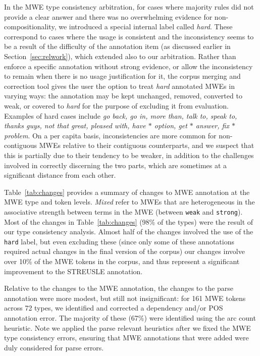 \documentclass[output=paper
,modfonts
,nonflat]{langsci/langscibook}
\newcommand{\lex}[1]{\textit{#1}\xspace}
\newcommand{\mwetype}[1]{\texttt{#1}\xspace}
\newcommand{\strongish}{\mwetype{strong}}
\newcommand{\weak}{\mwetype{weak}}
\newcommand{\hard}{\mwetype{hard}}
\newcommand{\gap}{$*$\xspace}
\newcommand{\tableref}[1]{Table~\ref{#1}\xspace}
\newcommand{\sectionref}[1]{Section~\ref{#1}\xspace}
\begin{document}
In the MWE type consistency arbitration, for cases where majority rules did not provide a clear answer and there was no overwhelming evidence for non-compositionality, we introduced a special internal label called \lex{hard}. These correspond to cases where the usage is consistent and the inconsistency seems to be a result of the difficulty of the annotation item (as discussed earlier in \sectionref{sec:relwork}), which extended also to our arbitration. Rather than enforce a specific annotation without strong evidence, or allow the inconsistency to remain when there is no usage justification for it, the corpus merging and correction tool gives the user the option to treat \lex{hard} annotated MWEs in varying ways: the annotation may be kept unchanged, removed, converted to weak, or covered to \lex{hard} for the purpose of excluding it from evaluation. Examples of hard cases include \lex{go back, go in, more than, talk to, speak to, thanks guys, not that great, pleased with, have \gap option, get \gap answer, fix \gap problem}. On a per capita basis, inconsistencies are more common for non-contiguous MWEs relative to their contiguous counterparts, and we suspect that this is partially due to their tendency to be weaker, in addition to the challenges involved in correctly discerning the two parts, which are sometimes at a significant distance from each other. 

\tableref{tab:changes} provides a summary of changes to MWE annotation at the MWE type and token levels.  \lex{Mixed} refer to MWEs that are heterogeneous in the associative strength between terms in the MWE (between \weak and \strongish). Most of the changes in \tableref{tab:changes} (98\% of the types) were the result of our type consistency analysis. Almost half of the changes involved the use of the \hard label, but even excluding these (since only some of these annotations required actual changes in the final version of the corpus) our changes involve over 10\% of the MWE tokens in the corpus, and thus represent a significant improvement to the STREUSLE annotation.  

Relative to the changes to the MWE annotation, the changes to the parse annotation were more modest, but still not insignificant: for 161 MWE tokens across 72 types, we identified and corrected a dependency and/or POS annotation error. The majority of these (67\%) were identified using the arc count heuristic. Note we applied the parse relevant heuristics after we fixed the MWE type consistency errors, ensuring that MWE annotations that were added were duly considered for parse errors.
\end{document}
